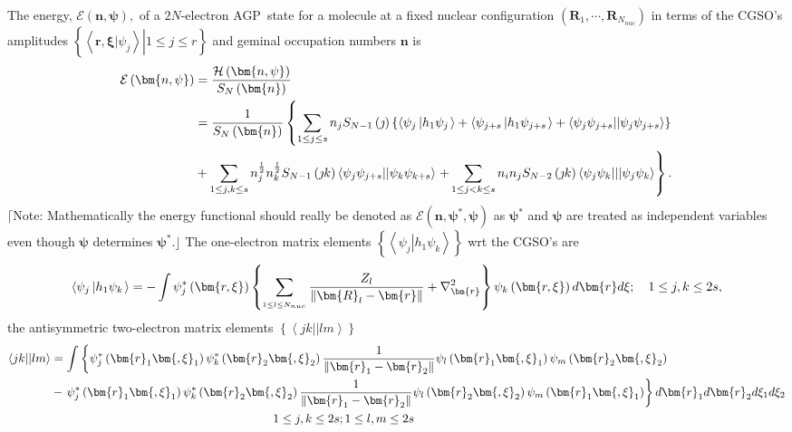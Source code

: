 \documentclass{preprint}
\begin{document}
The energy, $\mathcal{E}\left( \bm{n,\psi}\right) ,$ of a $2N$-electron AGP\
state for a molecule at a fixed nuclear configuration $\left( \bm{R}%
_{1},\cdots ,\bm{R}_{N_{nuc}}\right) $ in terms of the CGSO's amplitudes $%
\left\{ \left. \left\langle \left. \bm{r,\xi}\right\vert \psi
_{j}\right\rangle \right\vert 1\leq j\leq r\right\} $ and geminal occupation
numbers $\bm{n}$ is
\begin{align}
\mathcal{E}\left( \bm{n,\psi}\right) & =\frac{\mathcal{H}\left( \bm{n,\psi}%
\right) }{S_{N}\left( \bm{n}\right) }  \notag \\
& =\frac{1}{S_{N}\left( \bm{n}\right) }\left\{ \sum_{1\leq j\leq
s}n_{j}S_{N-1}\left( \jmath \right) \left\{ \left\langle \psi _{j}\left\vert
h_{1}\psi _{j}\right. \right\rangle +\left\langle \psi _{j+s}\left\vert
h_{1}\psi _{j+s}\right. \right\rangle +\left\langle \psi _{j}\psi
_{j+s}||\psi _{j}\psi _{j+s}\right\rangle \right\} \right.  \notag \\
& +\sum_{1\leq j,k\leq s}n_{j}^{\frac{1}{2}}n_{k}^{\frac{1}{2}}S_{N-1}\left(
\jmath k\right) \left\langle \psi _{j}\psi _{j+s}||\psi _{k}\psi
_{k+s}\right\rangle \left. +\sum_{1\leq j<k\leq s}n_{i}n_{j}S_{N-2}\left(
\jmath k\right) \left\langle \psi _{j}\psi _{k}|||\psi _{j}\psi
_{k}\right\rangle \right\} .  \label{energy}
\end{align}%
$\lceil $Note: Mathematically the energy functional should really be denoted
as $\mathcal{E}\left( \bm{n,\psi}^{\ast }\bm{,\psi}\right) $ as $\bm{\psi}%
^{\ast }$ and $\bm{\psi}$ are treated as independent variables even though $%
\bm{\psi}$ determines $\bm{\psi}^{\ast }$.$\rfloor $ The one-electron matrix
elements $\left\{ \left\langle \psi _{j}\left\vert h_{1}\psi _{k}\right.
\right\rangle \right\} $ wrt the CGSO's are
\begin{equation}
\left\langle \psi _{j}\left\vert h_{1}\psi _{k}\right. \right\rangle =-\int
\psi _{j}^{\ast }\left( \bm{r,\xi}\right) \left\{ \sum_{_{1\leq l\leq
N_{nuc}}}\frac{Z_{l}}{\left\Vert \bm{R}_{l}-\bm{r}\right\Vert }+\nabla _{%
\bm{r}}^{2}\right\} \psi _{k}\left( \bm{r,\xi}\right) d\bm{r}d\xi ;\quad
1\leq j,k\leq 2s,  \label{h1}
\end{equation}%
the antisymmetric two-electron matrix elements $\left\{ \left\langle
jk||lm\right\rangle \right\} $
\begin{align}
\left\langle jk||lm\right\rangle & =\int \left\{ \psi _{j}^{\ast }\left( %
\bm{r}_{1}\bm{,\xi}_{1}\right) \psi _{k}^{\ast }\left( \bm{r}_{2}\bm{,\xi}%
_{2}\right) \frac{1}{\left\Vert \bm{r}_{1}-\bm{r}_{2}\right\Vert }\psi
_{l}\left( \bm{r}_{1}\bm{,\xi}_{1}\right) \psi _{m}\left( \bm{r}_{2}\bm{,\xi}%
_{2}\right) \right.  \notag \\
& -\left. \psi _{j}^{\ast }\left( \bm{r}_{1}\bm{,\xi}_{1}\right) \psi
_{k}^{\ast }\left( \bm{r}_{2}\bm{,\xi}_{2}\right) \frac{1}{\left\Vert \bm{r}%
_{1}-\bm{r}_{2}\right\Vert }\psi _{l}\left( \bm{r}_{2}\bm{,\xi}_{2}\right)
\psi _{m}\left( \bm{r}_{1}\bm{,\xi}_{1}\right) \right\} d\bm{r}_{1}d\bm{r}%
_{2}d\xi _{1}d\xi _{2}  \notag \\
& \left. {}\right. \qquad \qquad \qquad \qquad \qquad \qquad \qquad \qquad
\qquad 1\leq j,k\leq 2s;1\leq l,m\leq 2s  \label{h2}
\end{align}%
\end{document}
